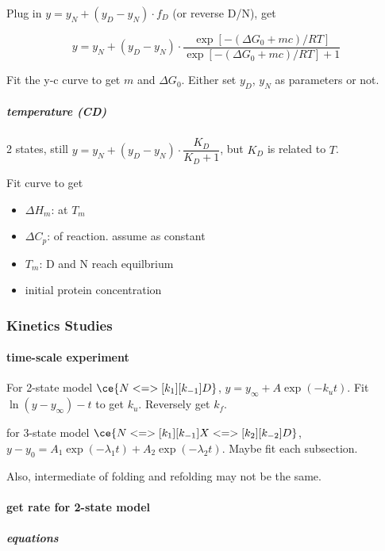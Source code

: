 \documentclass[]{article}
\let\oldparagraph\paragraph
\renewcommand{\paragraph}[1]{\oldparagraph{#1}\mbox{}}
\let\oldsubparagraph\subparagraph
\renewcommand{\subparagraph}[1]{\oldsubparagraph{#1}\mbox{}}
\begin{document}
Plug in \(y=y_N+(y_D-y_N)\cdot f_D\) (or reverse D/N), get

\[y=y_N+(y_D-y_N)\cdot\dfrac{\exp[-(\Delta G_0+mc)/RT]}{\exp[-(\Delta G_0+mc)/RT]+1}\]

Fit the y-c curve to get \(m\) and \(\Delta G_0\). Either set \(y_D\),
\(y_N\) as parameters or not.

\hypertarget{temperature-cd}{%
\subparagraph{temperature (CD)}\label{temperature-cd}}

2 states, still \(y=y_N+(y_D-y_N)\cdot\dfrac{K_D}{K_D+1}\), but \(K_D\)
is related to \(T\).

Fit curve to get

\begin{itemize}
\item
  \(\Delta H_m\): at \(T_m\)
\item
  \(\Delta C_p\): of reaction. assume as constant
\item
  \(T_m\): D and N reach equilbrium
\item
  initial protein concentration
\end{itemize}

\hypertarget{kinetics-studies}{%
\subsubsection{Kinetics Studies}\label{kinetics-studies}}

\hypertarget{time-scale-experiment}{%
\paragraph{time-scale experiment }\label{time-scale-experiment}}

For 2-state model \(\ce{N<=>[k_1][k_{-1}]D}\),
\(y=y_\infty+A\exp(-k_ut)\). Fit \(\ln(y-y_\infty)-t\) to get \(k_u\).
Reversely get \(k_f\).

for 3-state model \(\ce{N<=>[k_1][k_{-1}]X<=>[k_2][k_{-2}]D}\),
\(y-y_0=A_1\exp(-\lambda_1 t)+A_2\exp(-\lambda_2 t)\). Maybe fit each
subsection.

Also, intermediate of folding and refolding may not be the same.

\hypertarget{get-rate-for-2-state-model}{%
\paragraph{get rate for 2-state
model}\label{get-rate-for-2-state-model}}

\hypertarget{equations}{%
\subparagraph{equations}\label{equations}}
\end{document}
